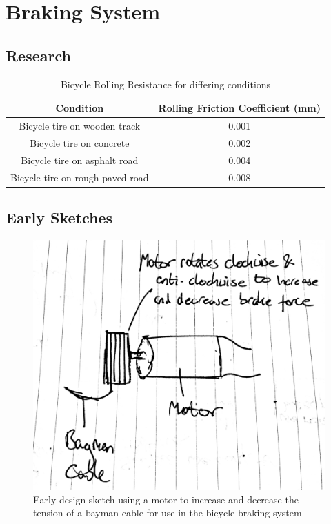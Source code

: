 \documentclass[a4paper]{report}
\begin{document}
{\chapter{Braking System}
\section{Research}

\begin{table}[h]

    \begin{tabular}{ | c | c |}
    \hline
    \textbf{Condition} & \textbf{Rolling Friction Coefficient (mm)} \\ \hline
   
   Bicycle tire on wooden track & 0.001   \\ \hline
   Bicycle tire on concrete & 0.002 \\ \hline
  Bicycle tire on asphalt road & 0.004 \\ \hline
  Bicycle tire on rough paved road & 0.008 \\ \hline

  \end{tabular}

\caption[Table caption text]{Bicycle Rolling Resistance for differing conditions \cite{cite:bicycle_friction}} 
\label{table:bicycle_friction}
\end{table}

\section{Early Sketches}
\label{app:early_sketches}

\begin{figure}[h]
\centering
\includegraphics[scale=0.25]{figures/early_sketches/braking_system/motor_cable_tension}
\caption{Early design sketch using a motor to increase and decrease the tension of a bayman cable for use in the bicycle braking system}
\label{fig:early_motor_cable_tension}
\end{figure}

}
\end{document}
